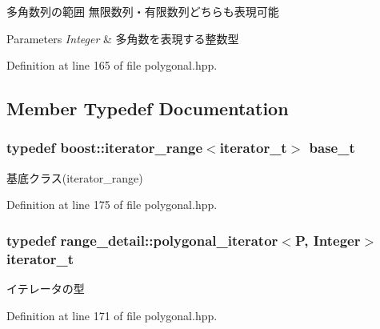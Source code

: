 多角数列の範囲 無限数列・有限数列どちらも表現可能 
\begin{DoxyParams}{\-Parameters}
{\em \-Integer} & 多角数を表現する整数型 \\
\hline
\end{DoxyParams}


\-Definition at line 165 of file polygonal.\-hpp.



\subsection{\-Member \-Typedef \-Documentation}
\hypertarget{classyuh_1_1polygonal__range_a9d51b0fc63206906184824c5b08403b2}{
\subsubsection[{base\-\_\-t}]{\setlength{\rightskip}{0pt plus 5cm}typedef boost\-::iterator\-\_\-range$<${\bf iterator\-\_\-t}$>$ {\bf base\-\_\-t}}}\label{d5/d2a/classyuh_1_1polygonal__range_a9d51b0fc63206906184824c5b08403b2}
基底クラス(iterator\-\_\-range) 

\-Definition at line 175 of file polygonal.\-hpp.

\hypertarget{classyuh_1_1polygonal__range_a824fcddb551991ff7719d081b900e909}{
\subsubsection[{iterator\-\_\-t}]{\setlength{\rightskip}{0pt plus 5cm}typedef {\bf range\-\_\-detail\-::polygonal\-\_\-iterator}$<$\-P, \-Integer$>$ {\bf iterator\-\_\-t}}}\label{d5/d2a/classyuh_1_1polygonal__range_a824fcddb551991ff7719d081b900e909}
イテレータの型 

\-Definition at line 171 of file polygonal.\-hpp.



